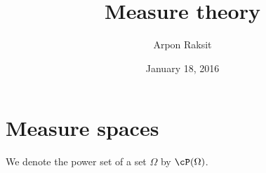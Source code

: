 

\title{Measure theory}
\author{Arpon Raksit}
\date{January 18, 2016}



\maketitle


\section{Measure spaces}

\begin{notation}
  We denote the power set of a set $\Omega$ by $\cP(\Omega)$.
\end{notation}

